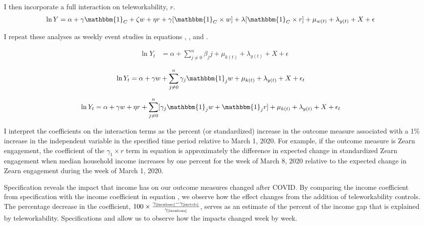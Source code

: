 I then incorporate a full interaction on teleworkability, $r$.
\begin{align} \label{inctele}
\ln Y &=  \alpha + \gamma \mathbbm{1}_{C} + \zeta w + \eta r  + \gamma[\mathbbm{1}_{C}\times w]
+ \lambda[\mathbbm{1}_{C}\times r] +\mu_{w\left(t\right)}+\lambda_{y\left(t\right)}+ X + \epsilon
\end{align}

I repeat these analyses as weekly event studies in equations , , and .

\begin{align} \label{week}
\ln Y_t &=  \alpha +\sum_{j\neq0}^{n}\beta_j j +\mu_{k(t)}+\lambda_{y(t)}+ X + \epsilon
\end{align}

\begin{align} \label{incaloneweek}
    \ln Y_t &=  \alpha + \gamma w + \sum_{j\neq0}^{n}\gamma_j \mathbbm{1}_j w +\mu_{k(t)}+\lambda_{y(t)}+X+\epsilon_t
\end{align}

\begin{align} \label{incteleweek}
    \ln Y_t &=  \alpha + \gamma w + \eta r + \sum_{j\neq0}^{n}[\gamma_j \mathbbm{1}_j w + \mathbbm{1}_j r] +\mu_{k(t)}+\lambda_{y(t)}+X+\epsilon_t
\end{align}

I interpret the coefficients on the interaction terms as the percent (or standardized) increase in the outcome measure associated with a 1\% increase in the independent variable in the specified time period relative to March 1, 2020.
For example, if the outcome measure is Zearn engagement, the coefficient of the $\gamma_1\times r$ term in equation  is approximately the difference in expected change in standardized Zearn engagement when median household income increases by one percent for the week of March 8, 2020 relative to the expected change in Zearn engagement during the week of March 1, 2020.
\par
Specification  reveals the impact that income has on our outcome measures changed after COVID.
By comparing the income coefficient from specification  with the income coefficient in equation , we observe how the effect changes from the addition of teleworkability controls.
The percentage decrease in the coefficient, $100 \times \frac{\gamma_\refeq{incalone}-\gamma_\refeq{inctele}}{\gamma_\refeq{incalone}}$, serves as an estimate of the percent of the income gap that is explained by teleworkability. Specifications  and  allow us to observe how the impacts changed week by week.  \par

